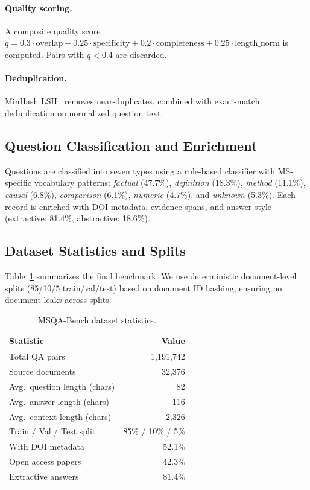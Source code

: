 \documentclass[11pt]{article}
\begin{document}
\paragraph{Quality scoring.} A composite quality score
$q = 0.3 \cdot \text{overlap} + 0.25 \cdot \text{specificity} + 0.2 \cdot \text{completeness} + 0.25 \cdot \text{length\_norm}$
is computed. Pairs with $q < 0.4$ are discarded.

\paragraph{Deduplication.} MinHash LSH~\citep{broder1997minwise} removes
near-duplicates, combined with exact-match deduplication on normalized
question text.

\subsection{Question Classification and Enrichment}

Questions are classified into seven types using a rule-based classifier with
MS-specific vocabulary patterns: \textit{factual} (47.7\%),
\textit{definition} (18.3\%), \textit{method} (11.1\%), \textit{causal}
(6.8\%), \textit{comparison} (6.1\%), \textit{numeric} (4.7\%), and
\textit{unknown} (5.3\%). Each record is enriched with DOI metadata, evidence
spans, and answer style (extractive: 81.4\%, abstractive: 18.6\%).

\subsection{Dataset Statistics and Splits}

Table~\ref{tab:dataset} summarizes the final benchmark. We use deterministic
document-level splits (85/10/5 train/val/test) based on document ID hashing,
ensuring no document leaks across splits.

\begin{table}[t]
\centering
\caption{MSQA-Bench dataset statistics.}
\label{tab:dataset}
\small
\begin{tabular}{@{}lr@{}}
\toprule
\textbf{Statistic} & \textbf{Value} \\
\midrule
Total QA pairs & 1,191,742 \\
Source documents & 32,376 \\
Avg.\ question length (chars) & 82 \\
Avg.\ answer length (chars) & 116 \\
Avg.\ context length (chars) & 2,326 \\
\midrule
Train / Val / Test split & 85\% / 10\% / 5\% \\
With DOI metadata & 52.1\% \\
Open access papers & 42.3\% \\
Extractive answers & 81.4\% \\
\bottomrule
\end{tabular}
\end{table}
\end{document}
